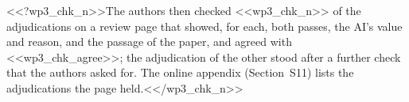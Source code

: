 <<?wp3_chk_n>>The authors then checked <<wp3_chk_n>> of the adjudications on a review page that showed, for each, both passes, the AI's value and reason, and the passage of the paper, and agreed with <<wp3_chk_agree>>; the adjudication of the other stood after a further check that the authors asked for. The online appendix (Section~S11) lists the adjudications the page held.<</wp3_chk_n>>
